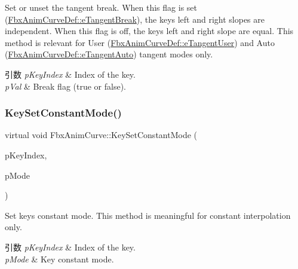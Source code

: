 Set or unset the tangent break. When this flag is set (\hyperlink{class_fbx_anim_curve_def_ac810ccc5ca0527704ab5175479964b87ab4d85a1a0474226be85b885518f6c847}{Fbx\+Anim\+Curve\+Def\+::e\+Tangent\+Break}), the key\textquotesingle{}s left and right slopes are independent. When this flag is off, the key\textquotesingle{}s left and right slope are equal. This method is relevant for User (\hyperlink{class_fbx_anim_curve_def_ac810ccc5ca0527704ab5175479964b87a199cb16b2c861b12c334093ce796cb86}{Fbx\+Anim\+Curve\+Def\+::e\+Tangent\+User}) and Auto (\hyperlink{class_fbx_anim_curve_def_ac810ccc5ca0527704ab5175479964b87a56e3bad364851277281e94e81327dd25}{Fbx\+Anim\+Curve\+Def\+::e\+Tangent\+Auto}) tangent modes only. 
\begin{DoxyParams}{引数}
{\em p\+Key\+Index} & Index of the key. \\
\hline
{\em p\+Val} & Break flag ({\ttfamily true} or {\ttfamily false}). \\
\hline
\end{DoxyParams}
\mbox{\label{class_fbx_anim_curve_a195063224af388d7064dc13910a89cb9}} 
\subsubsection{\texorpdfstring{Key\+Set\+Constant\+Mode()}{KeySetConstantMode()}}
{\footnotesize\ttfamily virtual void Fbx\+Anim\+Curve\+::\+Key\+Set\+Constant\+Mode (\begin{DoxyParamCaption}\item[{int}]{p\+Key\+Index,  }\item[{\hyperlink{class_fbx_anim_curve_def_a52885abd392ac8ac3da94bafc5fddd64}{Fbx\+Anim\+Curve\+Def\+::\+E\+Constant\+Mode}}]{p\+Mode }\end{DoxyParamCaption})\hspace{0.3cm}{\ttfamily [pure virtual]}}

Set key\textquotesingle{}s constant mode. This method is meaningful for constant interpolation only. 
\begin{DoxyParams}{引数}
{\em p\+Key\+Index} & Index of the key. \\
\hline
{\em p\+Mode} & Key constant mode. \\
\hline
\end{DoxyParams}
\mbox{\label{class_fbx_anim_curve_aa9de6c77c7d81def717ff34f01a660fb}} 
